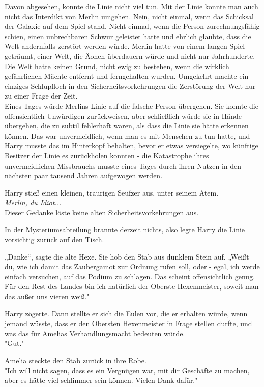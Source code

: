 {Davon abgesehen, konnte die Linie nicht viel tun. Mit der Linie konnte man auch nicht das Interdikt von Merlin umgehen. Nein, nicht einmal, wenn das Schicksal der Galaxie auf dem Spiel stand. Nicht einmal, wenn die Person zurechnungsfähig schien, einen unbrechbaren Schwur geleistet hatte und ehrlich glaubte, dass die Welt andernfalls zerstört werden würde. Merlin hatte von einem langen Spiel geträumt, einer Welt, die Äonen überdauern würde und nicht nur Jahrhunderte. Die Welt hatte keinen Grund, nicht ewig zu bestehen, wenn die wirklich gefährlichen Mächte entfernt und ferngehalten wurden. Umgekehrt machte ein einziges Schlupfloch in den Sicherheitsvorkehrungen die Zerstörung der Welt nur zu einer Frage der Zeit.\\ Eines Tages würde Merlins Linie auf die falsche Person übergehen. Sie konnte die offensichtlich Unwürdigen zurückweisen, aber schließlich würde sie in Hände übergehen, die zu subtil fehlerhaft waren, als dass die Linie sie hätte erkennen können. Das war unvermeidlich, wenn man es mit Menschen zu tun hatte, und Harry musste das im Hinterkopf behalten, bevor er etwas versiegelte, wo künftige Besitzer der Linie es zurückholen konnten - die Katastrophe ihres unvermeidlichen Missbrauchs musste eines Tages durch ihren Nutzen in den nächsten paar tausend Jahren aufgewogen werden.

Harry stieß einen kleinen, traurigen Seufzer aus, unter seinem Atem.\\ \emph{Merlin, du Idiot...}\\ Dieser Gedanke löste keine alten Sicherheitsvorkehrungen aus.

In der Mysteriumsabteilung brannte derzeit nichts, also legte Harry die Linie vorsichtig zurück auf den Tisch.

„Danke“, sagte die alte Hexe. Sie hob den Stab aus dunklem Stein auf. „Weißt du, wie ich damit das Zaubergamot zur Ordnung rufen soll, oder - egal, ich werde einfach versuchen, auf das Podium zu schlagen. Das scheint offensichtlich genug. Für den Rest des Landes bin ich natürlich der Oberste Hexenmeister, soweit man das außer uns vieren weiß."

Harry zögerte. Dann stellte er sich die Eulen vor, die er erhalten würde, wenn jemand wüsste, dass er den Obersten Hexenmeister in Frage stellen durfte, und was das für Amelias Verhandlungsmacht bedeuten würde.\\ "Gut."

Amelia steckte den Stab zurück in ihre Robe.\\ "Ich will nicht sagen, dass es ein Vergnügen war, mit dir Geschäfte zu machen, aber es hätte viel schlimmer sein können. Vielen Dank dafür."

}
